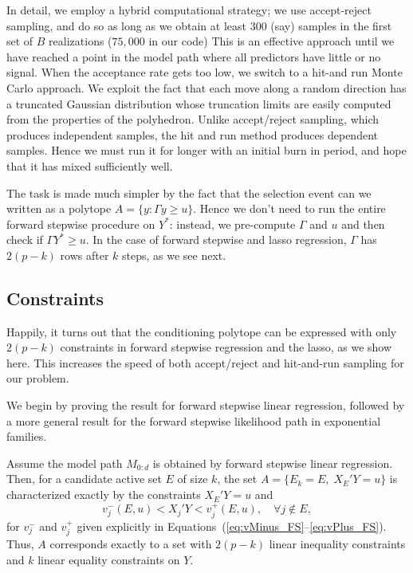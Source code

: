 \documentclass{article}
\begin{document}
In detail, we employ a hybrid computational strategy; we use accept-reject sampling, and do so as long as we obtain at least 300 (say) samples in the first set of $B$ realizations ($75,000$ in our code)  This is an effective approach until we have reached a point in the model path where all predictors have little or no signal. When the acceptance rate gets too low, we switch to a hit-and run Monte Carlo approach. We exploit the fact that each move along a random direction  has a truncated Gaussian distribution whose truncation limits are easily computed from the properties of the polyhedron. Unlike accept/reject sampling, which produces independent samples,  the hit and run method produces dependent samples. Hence we must run it for longer with an initial burn in period, and hope that it has mixed sufficiently well.

The task is made much simpler by the fact that the selection event can we written as a polytope $A=\{y: \Gamma y \geq u\}$. Hence we don't need to run the entire forward stepwise procedure on $Y^*$: instead, we pre-compute $\Gamma$ and $u$ and then check if $\Gamma Y^* \geq u$. In the case of forward stepwise and lasso regression, $\Gamma$ has $2(p-k)$ rows after $k$ steps, as we see next.

\subsection{Constraints}\label{sec:constrainsts}
Happily, it turns out that the conditioning polytope can be expressed with only $2(p-k)$ constraints in forward stepwise regression and the lasso, as we show here. This increases the speed of both accept/reject and hit-and-run sampling for our problem.

We begin by proving the result for forward stepwise linear regression, followed by a more general result for the forward stepwise likelihood path in exponential families.

\begin{theorem}
  Assume the model path $M_{0:d}$ is obtained by forward stepwise 
  linear regression. Then, for a candidate active set $E$ of size $k$, 
  the set $A = \{E_k = E, \;X_E'Y = u\}$ is characterized 
  exactly by the constraints $X_E'Y=u$ and
  \[
  v_j^-(E,u) < X_j'Y < v_j^+(E,u), \quad\forall j \notin E,
  \]
  for $v_j^-$ and $v_j^+$ given explicitly in
  Equations~(\ref{eq:vMinus_FS}--\ref{eq:vPlus_FS}).
  Thus, $A$ corresponds exactly to 
  a set with $2(p-k)$ linear inequality constraints and $k$
  linear equality constraints on $Y$.
\end{theorem}
\end{document}
